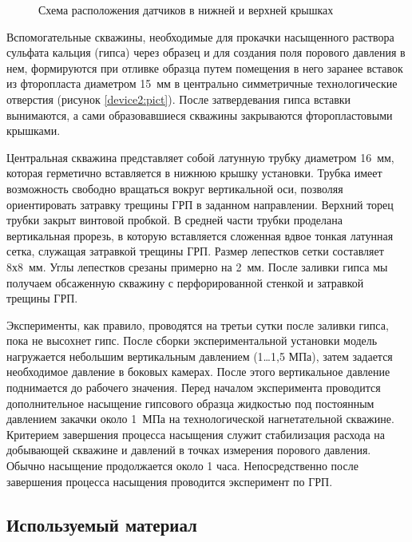 \begin{figure}[hb]
\begin{center}
\end{center}
\caption{Схема расположения датчиков в нижней и верхней крышках}\label{device3:pict}
\end{figure}

Вспомогательные скважины, необходимые для прокачки насыщенного раствора сульфата кальция (гипса) через образец и для создания поля порового давления в нем, формируются при отливке образца путем помещения в него заранее вставок из фторопласта диаметром 15~мм в центрально симметричные технологические отверстия (рисунок \ref{device2:pict}). После затвердевания гипса вставки вынимаются, а сами образовавшиеся скважины закрываются фторопластовыми крышками.

Центральная скважина представляет собой латунную трубку диаметром 16~мм, которая герметично вставляется в нижнюю крышку установки. Трубка имеет возможность свободно вращаться вокруг вертикальной оси, позволяя ориентировать затравку трещины ГРП в заданном направлении. Верхний торец трубки закрыт винтовой пробкой. В средней части трубки проделана вертикальная прорезь, в которую вставляется сложенная вдвое тонкая латунная сетка, служащая затравкой трещины ГРП. Размер лепестков сетки составляет 8х8~мм. Углы лепестков срезаны примерно на 2~мм. После заливки гипса мы получаем обсаженную скважину с перфорированной стенкой и затравкой трещины ГРП.

Эксперименты, как правило, проводятся на третьи сутки после заливки гипса, пока не высохнет гипс. После сборки экспериментальной установки модель нагружается небольшим вертикальным давлением (1…1,5 МПа), затем задается необходимое давление в боковых камерах. После этого вертикальное давление поднимается до рабочего значения. Перед началом эксперимента проводится дополнительное насыщение гипсового образца жидкостью под постоянным давлением закачки около 1~МПа на технологической нагнетательной скважине. Критерием завершения процесса насыщения служит стабилизация расхода на добывающей скважине и давлений в точках измерения порового давления. Обычно насыщение продолжается около 1 часа. Непосредственно после завершения процесса насыщения проводится эксперимент по ГРП.

\subsection{Используемый материал}

